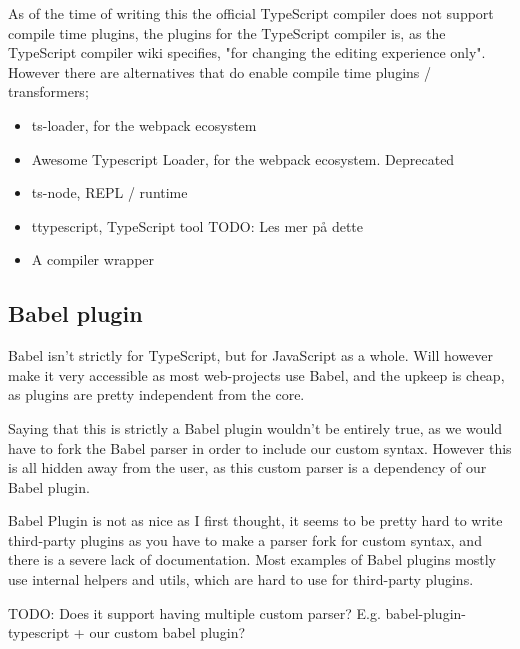 
As of the time of writing this the official TypeScript compiler does not support compile time plugins, the plugins for the TypeScript compiler is, as the TypeScript compiler wiki specifies, "for changing the editing experience only"\cite{tscplugin}.
However there are alternatives that do enable compile time plugins / transformers;

\begin{itemize}
    \item ts-loader\cite{tsloadergithub}, for the webpack ecosystem
    \item Awesome Typescript Loader\cite{awesometypescriptloadergithub}, for the webpack ecosystem. Deprecated
    \item ts-node\cite{tsnodegithub}, REPL / runtime
    \item ttypescript\cite{ttypescriptgithub}, TypeScript tool TODO: Les mer på dette
    \item A compiler wrapper
\end{itemize}


\subsection{Babel plugin}\label{subsec:babel-plugin}

Babel isn't strictly for TypeScript, but for JavaScript as a whole.
Will however make it very accessible as most web-projects use Babel, and the upkeep is cheap, as plugins are pretty independent from the core.

Saying that this is strictly a Babel plugin wouldn't be entirely true, as we would have to fork the Babel parser in order to include our custom syntax\cite{babelparserdocs}.
However this is all hidden away from the user, as this custom parser is a dependency of our Babel plugin.

Babel Plugin is not as nice as I first thought, it seems to be pretty hard to write third-party plugins as you have to make a parser fork for custom syntax, and there is a severe lack of documentation.
Most examples of Babel plugins mostly use internal helpers and utils, which are hard to use for third-party plugins.

TODO: Does it support having multiple custom parser?
E.g. babel-plugin-typescript + our custom babel plugin?
